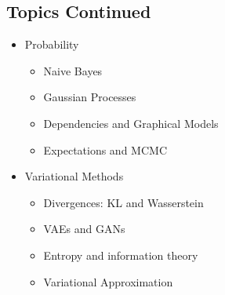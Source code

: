 \begin{slide}
\section{Topics Continued}

\begin{PauseHighLight}
  \begin{itemize}
  \item Probability
    \begin{itemize}
    \item Naive Bayes
    \item Gaussian Processes
    \item Dependencies and Graphical Models
    \item Expectations and MCMC\pause
    \end{itemize}
  \item Variational Methods
    \begin{itemize}
    \item Divergences: KL and Wasserstein
    \item VAEs and GANs
    \item Entropy and information theory
    \item Variational Approximation\pause
    \end{itemize}
  \end{itemize}
\end{PauseHighLight}

\end{slide}


